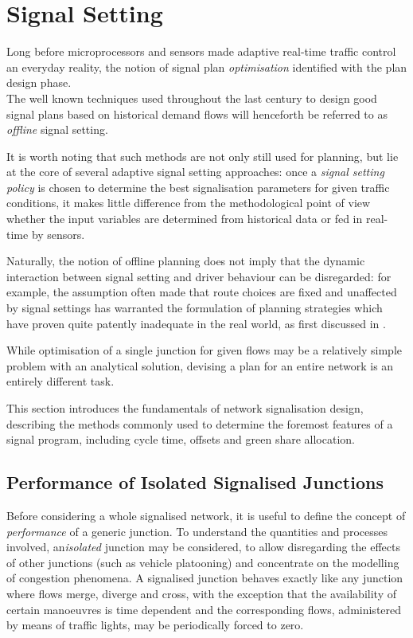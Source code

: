 \section{Signal Setting}
Long before microprocessors and sensors made adaptive real-time traffic control an everyday reality, the notion of signal plan \emph{optimisation} identified with the plan design phase.\\
The well known techniques used throughout the last century to design good signal plans based on historical demand flows will henceforth be referred to as \emph{offline} signal setting.

It is worth noting that such methods are not only still used for planning, but lie at the core of several adaptive signal setting approaches: once a \emph{signal setting policy} is chosen to determine the best signalisation parameters for given traffic conditions, it makes little difference from the methodological point of view whether the input variables are determined from historical data or fed in real-time by sensors. 

Naturally, the notion of offline planning does not imply that the dynamic interaction between signal setting and driver behaviour can be disregarded: for example, the assumption often made that route choices are fixed and unaffected by signal settings has warranted the formulation of planning strategies which have proven quite patently inadequate in the real world, as first discussed in \citep{dickson1981note}.

While optimisation of a single junction for given flows may be a relatively simple problem with an analytical solution, devising a plan for an entire network is an entirely different task.

This section introduces the fundamentals of network signalisation design, describing the methods commonly used to determine the foremost features of a signal program, including cycle time, offsets and green share allocation.

\subsection{Performance of Isolated Signalised Junctions} \label{s:performance}
Before considering a whole signalised network, it is useful to define the concept of \emph{performance} of a generic junction. To understand the quantities and processes involved, an\emph{isolated} junction may be considered, to allow disregarding the effects of other junctions (such as vehicle platooning) and concentrate on the modelling of congestion phenomena. 
A signalised junction behaves exactly like any junction where flows merge, diverge and cross, with the exception that the availability of certain manoeuvres is time dependent and the corresponding flows, administered by means of traffic lights, may be periodically forced to zero.

